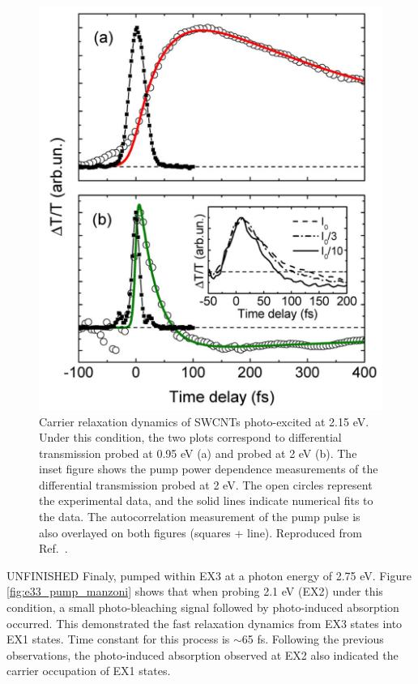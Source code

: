 \begin{figure}[H]
	\centering
	\includegraphics[scale=0.3]{images/chapter_prior_works/e22_pump_probe_manzoni}
	\caption{Carrier relaxation dynamics of SWCNTs photo-excited at 2.15 eV. Under this condition, the two plots correspond to differential transmission probed at 0.95 eV (a) and probed at 2 eV (b). The inset figure shows the pump power dependence measurements of the differential transmission probed at 2 eV. The open circles represent the experimental data, and the solid lines indicate numerical fits to the data. The autocorrelation measurement of the pump pulse is also overlayed on both figures (squares + line). Reproduced from Ref.\ \cite{manzoni2005intersubband}.}
	\label{fig:e22_pump_manzoni}
\end{figure}

{\color{red} UNFINISHED} Finaly, pumped within EX3 at a photon energy of 2.75 eV. Figure \ref{fig:e33_pump_manzoni} shows that when probing 2.1 eV (EX2) under this condition, a small photo-bleaching signal followed by photo-induced absorption occurred. This demonstrated the fast relaxation dynamics from EX3 states into EX1 states. Time constant for this process is $\sim$65 fs. Following the previous observations, the photo-induced absorption observed at EX2 also indicated the carrier occupation of EX1 states.

